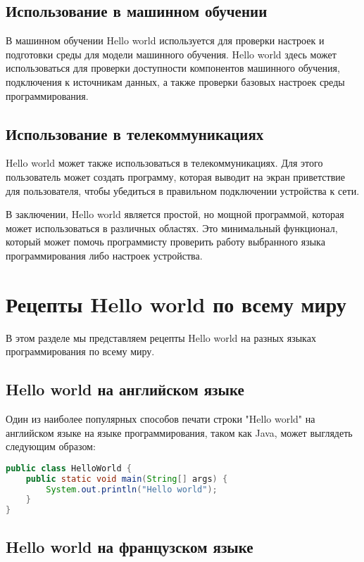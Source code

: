 \documentclass[draft]{article}
\begin{document}
\subsection{Использование в машинном обучении}
В машинном обучении Hello world используется для проверки настроек и подготовки среды для модели машинного обучения. Hello world здесь может использоваться для проверки доступности компонентов машинного обучения, подключения к источникам данных, а также проверки базовых настроек среды программирования.

\subsection{Использование в телекоммуникациях}
Hello world может также использоваться в телекоммуникациях. Для этого пользователь может создать программу, которая выводит на экран приветствие для пользователя, чтобы убедиться в правильном подключении устройства к сети.

В заключении, Hello world является простой, но мощной программой, которая может использоваться в различных областях. Это минимальный функционал, который может помочь программисту проверить работу выбранного языка программирования либо настроек устройства.\newpage\section{Рецепты Hello world по всему миру}

В этом разделе мы представляем рецепты Hello world на разных языках программирования по всему миру.

\subsection{Hello world на английском языке}

Один из наиболее популярных способов печати строки "Hello world" на английском языке на языке программирования, таком как Java, может выглядеть следующим образом:

\begin{lstlisting}[language=Java]
public class HelloWorld {
    public static void main(String[] args) {
        System.out.println("Hello world");
    }
}
\end{lstlisting}

\subsection{Hello world на французском языке}
\end{document}
